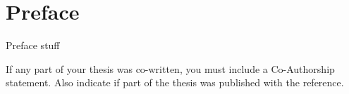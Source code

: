 
\chapter{Preface}
Preface stuff

If any part of your thesis was co-written, you must include a
Co-Author\-ship statement. Also indicate if part of the thesis was published with the reference.
